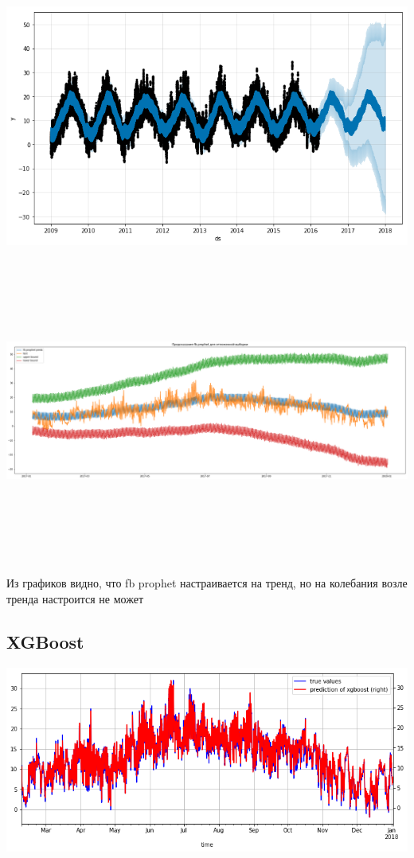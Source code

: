 \documentclass[11pt]{article}
\begin{document}
\begin{center}
\includegraphics[width=15cm]{./pics/fb_prophet_prediction_1.png}
\end{center}
\begin{center}
\includegraphics[width=15cm,height=10cm]{./pics/fb_prophet_prediction_2.png}
\end{center}

Из графиков видно, что fb prophet настраивается на тренд, но на колебания возле тренда настроится не может
\subsection{XGBoost}
\label{sec:org1d83c51}
\begin{center}
\includegraphics[width=15cm]{./pics/xgboost_predictions_3_cities.png}
\end{center}
\end{document}
